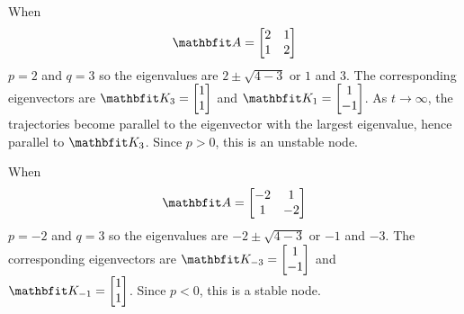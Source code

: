 \begin{example}
When $$\vect{A}=\begin{bmatrix}2 & 1 \\ 1 & 2 \end{bmatrix}$$
$p=2$ and $q=3$ so
the eigenvalues are $2\pm\sqrt{4-3}$ or $1$ and $3$.  The corresponding
eigenvectors are $\vect{K}_3=\begin{bmatrix} 1 \\ 1 \end{bmatrix}$ and
$\vect{K}_1=\begin{bmatrix} 1 \\ -1 \end{bmatrix}$.  As $t\to\infty$, the
trajectories become parallel to the eigenvector with the largest eigenvalue, 
hence parallel to $\vect{K}_3$.  Since $p>0$, this is an unstable node.

\begin{center}
\end{center}
\end{example}

\begin{example}
When $$\vect{A}=\begin{bmatrix}-2 & 1 \\ 1 & -2 \end{bmatrix}$$
$p=-2$ and $q=3$ so
the eigenvalues are $-2\pm\sqrt{4-3}$ or $-1$ and $-3$.  The corresponding
eigenvectors are $\vect{K}_{-3}=\begin{bmatrix} 1 \\ -1 \end{bmatrix}$ and
$\vect{K}_{-1}=\begin{bmatrix} 1 \\ 1 \end{bmatrix}$.  
Since $p<0$, this is a stable node.

\begin{center}
\end{center}
\end{example}

